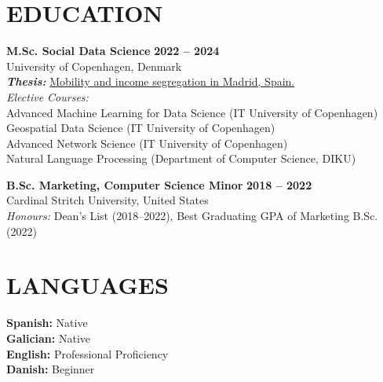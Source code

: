 \documentclass{resume}
\begin{document}
\section{EDUCATION} 
\begin{content}
    {\bf M.Sc. Social Data Science} \hfill {\bf 2022 -- 2024} \\
    University of Copenhagen, Denmark \\
    {\bf \em Thesis:} {\href{https://github.com/carobs9/segregation-madrid}{Mobility and income segregation in Madrid, Spain.}} \\ 
    {\em Elective Courses:} \\
    {\small
    Advanced Machine Learning for Data Science (IT University of Copenhagen) \\ 
    Geospatial Data Science (IT University of Copenhagen) \\
    Advanced Network Science (IT University of Copenhagen) \\
    Natural Language Processing (Department of Computer Science, DIKU) \\
    }


    {\bf B.Sc. Marketing, Computer Science Minor} \hfill {\bf 2018 -- 2022} \\
    Cardinal Stritch University, United States \\
    {\em Honours:} Dean's List (2018--2022), Best Graduating GPA of Marketing B.Sc. (2022)
\end{content}

\section{LANGUAGES} 
\begin{content}
    {\bf Spanish:} Native \\
    {\bf Galician:} Native \\
    {\bf English:} Professional Proficiency  \\
    {\bf Danish:} Beginner \\
\end{content}

\end{document}
